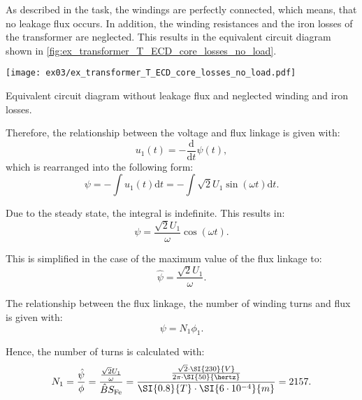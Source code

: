 \begin{solutionblock}
  As described in the task, the windings are perfectly connected, which means, that no leakage flux occurs. In addition, the winding resistances and the iron losses of the transformer are neglected. This results in the equivalent circuit diagram shown in \autoref{fig:ex_transformer_T_ECD_core_losses_no_load}.
  \begin{solutionfigure}[ht!]
    \centering
    \texttt{[image: ex03/ex\_transformer\_T\_ECD\_core\_losses\_no\_load.pdf]}
    \caption{Equivalent circuit diagram without leakage flux and neglected winding and iron losses.}
    \label{fig:ex_transformer_T_ECD_core_losses_no_load}
  \end{solutionfigure}


  Therefore, the relationship between the voltage and flux linkage is given with:
  \begin{equation}
    u_{\mathrm{1}}(t) = -\frac{\mathrm{d}}{\mathrm{d}t} \psi(t),
  \end{equation}
  which is rearranged into the following form:
  \begin{equation}
    \psi = - \int u_{\mathrm{1}}(t) \mathrm{d}t
    = - \int \sqrt{2} U_{\mathrm{1}} \sin(\omega t) \mathrm{d}t.
  \end{equation}

  Due to the steady state, the integral is indefinite. This results in:
  \begin{equation}
    \psi = \frac{\sqrt{2}U_{\mathrm{1}}}{\omega} \cos(\omega t).
  \end{equation}

  This is simplified in the case of the maximum value of the flux linkage to:
  \begin{equation}
    \hat{\psi} = \frac{\sqrt{2}U_{\mathrm{1}}}{\omega}.
  \end{equation}

  The relationship between the flux linkage, the number of winding turns and flux is given with:
  \begin{equation}
    \psi = N_{\mathrm{1}} \phi_{\mathrm{1}}.
  \end{equation}


  Hence, the number of turns is calculated with:
  \begin{equation}
    N_{\mathrm{1}} = \frac{\hat{\psi}}{\phi}
    = \frac{\frac{\sqrt{2}U_{\mathrm{1}}}{\omega}}{\hat{B} S_{\mathrm{Fe}}}
    =\frac{\frac{\sqrt{2} \cdot \SI{230}{V}}{2\pi \cdot \SI{50}{\hertz}}}{\SI{0.8}{T} \cdot \SI{6\cdot 10^{-4}}{m}}
    = 2157.
    \label{eq:eq1}
  \end{equation}



\end{solutionblock}
